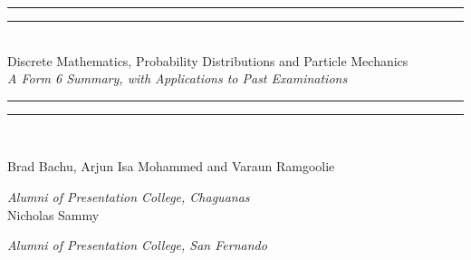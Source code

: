 \providecommand{\HUGE}{\Huge}%
\newlength{\drop}%

\thispagestyle{empty}
\begingroup%
\textheight
\begin{center}
\settowidth{\unitlength}{\HUGE Discrete Mathematics, Probability}
\vspace*{\baselineskip}
\rule{1.3 \unitlength}{1.6pt}\vspace*{-\baselineskip}\vspace*{2pt}
\rule{1.3 \unitlength}{0.4pt}\\[\baselineskip]
{\HUGE Discrete Mathematics, Probability Distributions and Particle Mechanics}\\[\baselineskip]
{\slshape \large A Form 6 Summary, with Applications to Past Examinations}\\[0.2\baselineskip]
\rule{1.3 \unitlength}{0.4pt}\vspace*{-\baselineskip}\vspace{3.2pt}
\rule{1.3 \unitlength}{1.6pt}\\[\baselineskip]
\vfill
\begin{figure}[h!]
	\centering
	\fboxsep=7mm %
	\fboxrule=4pt %
\end{figure} 
\vfill
{\large\rmfamily Brad Bachu, Arjun Isa Mohammed and Varaun Ramgoolie}\par
{\itshape Alumni of Presentation College, Chaguanas}\\[\baselineskip]
{\large\rmfamily Nicholas Sammy}\par
{\itshape Alumni of Presentation College, San Fernando}\\[\baselineskip]
\vfill
\end{center}
\clearpage

